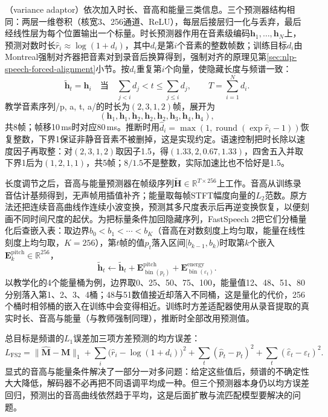 （variance adaptor）依次加入时长、音高和能量三类信息。三个预测器结构相同：两层一维卷积（核宽3、256通道、ReLU），每层后接层归一化与丢弃，最后经线性层为每个位置输出一个标量。时长预测器作用在音素级编码$\bm{h}_1,\ldots,\bm{h}_N$上，预测对数时长$\hat r_i\approx\log(1+d_i)$，其中$d_i$是第$i$个音素的整数帧数；训练目标$d_i$由Montreal强制对齐器把音素对到录音后换算得到\cite{nlp-speech-mcauliffe2017}，强制对齐的原理见第\ref{sec:nlp-speech-forced-alignment}小节。按$d_i$重复第$i$个向量，使隐藏长度与频谱一致：
\begin{equation}
 \widetilde{\bm{h}}_t=\bm{h}_i
 \quad\text{当}\quad
 \sum_{j<i}d_j<t\leq\sum_{j\leq i}d_j,
 \qquad T=\sum_{i=1}^{N}d_i.
 \label{eq:nlp-speech-length-regulator}
\end{equation}
教学音素序列/p, a, t, a/的时长为$(2,3,1,2)$帧，展开为
\[
  (\bm{h}_1,\bm{h}_1,\bm{h}_2,\bm{h}_2,\bm{h}_2,\bm{h}_3,\bm{h}_4,\bm{h}_4),
\]
共8帧；帧移10\,ms时对应80\,ms。推断时用$\hat d_i=\max(1,\operatorname{round}(\exp\hat r_i-1))$恢复整数，下界1保证非静音音素不被删掉，这是实现约定。语速控制把时长除以速度因子再取整：对$(2,3,1,2)$取因子1.5，得$(1.33,2,0.67,1.33)$，四舍五入并取下界1后为$(1,2,1,1)$，共5帧；$8/1.5$不是整数，实际加速比也不恰好是1.5。

长度调节之后，音高与能量预测器在帧级序列$\widetilde{\bm{H}}\in\mathbb{R}^{T\times256}$上工作。音高从训练录音估计基频得到，无声帧用插值补齐；能量取每帧STFT幅度向量的$L_2$范数。原方法还把连续音高曲线作连续小波变换，预测其多尺度表示后再逆变换恢复，以便刻画不同时间尺度的起伏。为把标量条件加回隐藏序列，FastSpeech 2把它们分桶量化后查嵌入表：取边界$b_0<b_1<\cdots<b_{K}$（音高在对数刻度上均匀取，能量在线性刻度上均匀取，$K=256$），第$t$帧的值$p_t$落入区间$[b_{k-1},b_k)$时取第$k$个嵌入$\bm{E}^{\mathrm{pitch}}_k\in\mathbb{R}^{256}$，
\begin{equation}
  \widetilde{\bm{h}}_t\leftarrow\widetilde{\bm{h}}_t
  +\bm{E}^{\mathrm{pitch}}_{\operatorname{bin}(p_t)}
  +\bm{E}^{\mathrm{energy}}_{\operatorname{bin}(\varepsilon_t)} .
  \label{eq:nlp-speech-variance-embed}
\end{equation}
以教学化的4个能量桶为例，边界取0、25、50、75、100，能量值12、48、51、80分别落入第1、2、3、4桶；48与51数值接近却落入不同桶，这是量化的代价，256个桶时相邻桶的嵌入在训练中会变得相近。训练时方差适配器使用从录音提取的真实时长、音高与能量（与教师强制同理），推断时全部改用预测值。

总目标是频谱的$L_1$误差加三项方差预测的均方误差：
\begin{equation}
  L_{\mathrm{FS2}}=\lVert\widehat{\bm{M}}-\bm{M}\rVert_1
  +\sum_{i}\bigl(\hat r_i-\log(1+d_i)\bigr)^2
  +\sum_{t}(\hat p_t-p_t)^2+\sum_{t}(\hat\varepsilon_t-\varepsilon_t)^2 .
  \label{eq:nlp-speech-fs2-loss}
\end{equation}
显式的音高与能量条件解决了一部分一对多问题：给定这些值后，频谱的不确定性大大降低，解码器不必再把不同语调平均成一种。但三个预测器本身仍以均方误差回归，预测出的音高曲线依然趋于平均，这是后面扩散与流匹配模型要解决的问题。

